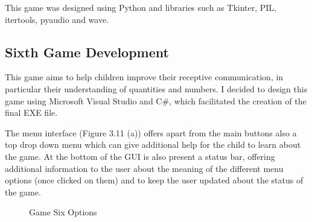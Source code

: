 This game was designed using Python and libraries such as Tkinter, PIL, itertools, pyaudio and wave.

\subsection{Sixth Game Development}
This game aims to help children improve their receptive communication, in particular their understanding of quantities and numbers. I decided to design this game using Microsoft Visual Studio and C\#, which facilitated the creation of the final EXE file. 


The menu interface (Figure 3.11 (a)) offers apart from the main buttons also a top drop down menu which can give additional help for the child to learn about the game. At the bottom of the GUI is also present a status bar, offering additional information to the user about the meaning of the different menu options (once clicked on them) and to keep the user updated about the status of the game.


\begin{figure}[ht!]%
    \centering
    \qquad
    \caption{Game Six Options}%
    \label{fig:example2}%
\end{figure}

